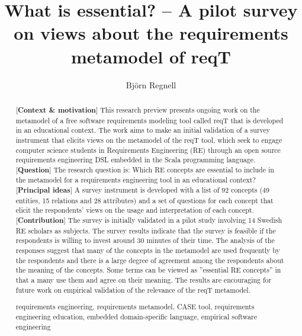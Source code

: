 \documentclass[a4paper]{llncs}
\newcommand{\keywords}[1]{\par\addvspace\baselineskip
\noindent\keywordname\enspace\ignorespaces#1}
\begin{document}

\mainmatter  %

\title{What is essential? -- A pilot survey on views about the requirements metamodel of reqT}


\author{Bj\"orn Regnell}
%


\maketitle

\begin{abstract}
[{\bf Context \& motivation}] This research preview presents ongoing work on the metamodel of a free software requirements modeling tool called reqT that is developed in an educational context. The work aims to make an initial validation of a survey instrument that elicits views on the metamodel of the reqT tool, which seek to engage computer science students in Requirements Engineering (RE) through an open source requirements engineering DSL embedded in the Scala programming language. [{\bf Question}] The research question is: Which RE concepts are essential to include in the metamodel for a requirements engineering tool in an educational context?  [{\bf Principal ideas}] A survey instrument is developed with a list of 92 concepts (49 entities, 15 relations and 28 attributes) and a set of questions for each concept that elicit the respondents' views on the usage and interpretation of each concept.  [{\bf Contribution}] The survey is initially validated in a pilot study involving 14 Swedish RE scholars as subjects. The survey results indicate that the survey is feasible if the respondents is willing to invest around 30 minutes of their time. The analysis of the responses suggest that many of the concepts in the metamodel are used frequently by the respondents and there is a large degree of agreement among the respondents about the meaning of the concepts. Some terms can be viewed as ''essential RE concepts'' in that a many use them and agree on their meaning. The results are encouraging for future work on empirical validation of the relevance of the reqT metamodel. 

\keywords{requirements engineering, requirements metamodel, CASE tool, requirements engineering education, embedded domain-specific language, empirical software engineering}
\end{abstract}
\end{document}
